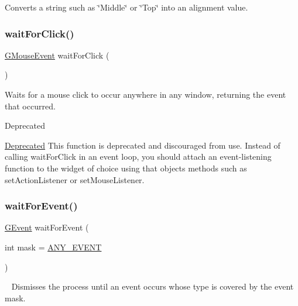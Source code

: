 Converts a string such as \char`\"{}\+Middle\char`\"{} or \char`\"{}\+Top\char`\"{} into an alignment value. 

\mbox{\label{namespacesgl_ae6780e0be2caaa8a595026b472e74808}} 
\subsubsection{\texorpdfstring{wait\+For\+Click()}{waitForClick()}}
{\footnotesize\ttfamily \mbox{\hyperlink{namespacesgl_a0bc653774bff0fd137896d1cafcf8fb9}{G\+Mouse\+Event}} wait\+For\+Click (\begin{DoxyParamCaption}{ }\end{DoxyParamCaption})}



Waits for a mouse click to occur anywhere in any window, returning the event that occurred. 

\begin{DoxyRefDesc}{Deprecated}
\item[\mbox{\hyperlink{deprecated__deprecated000004}{Deprecated}}]This function is deprecated and discouraged from use. Instead of calling wait\+For\+Click in an event loop, you should attach an event-\/listening function to the widget of choice using that object\textquotesingle{}s methods such as set\+Action\+Listener or set\+Mouse\+Listener. \end{DoxyRefDesc}
\mbox{\label{namespacesgl_ac49283a36a844e5c07ce0b199f481c9f}} 
\subsubsection{\texorpdfstring{wait\+For\+Event()}{waitForEvent()}}
{\footnotesize\ttfamily \mbox{\hyperlink{classsgl_1_1GEvent}{G\+Event}} wait\+For\+Event (\begin{DoxyParamCaption}\item[{int}]{mask = {\ttfamily \mbox{\hyperlink{namespacesgl_a6ff6e8ee75a08092e30167b2b7c5d6f7adb39e2dc0584d3e28dad8abaa4b926b7}{A\+N\+Y\+\_\+\+E\+V\+E\+NT}}} }\end{DoxyParamCaption})}



~\newline
 Dismisses the process until an event occurs whose type is covered by the event mask. 

